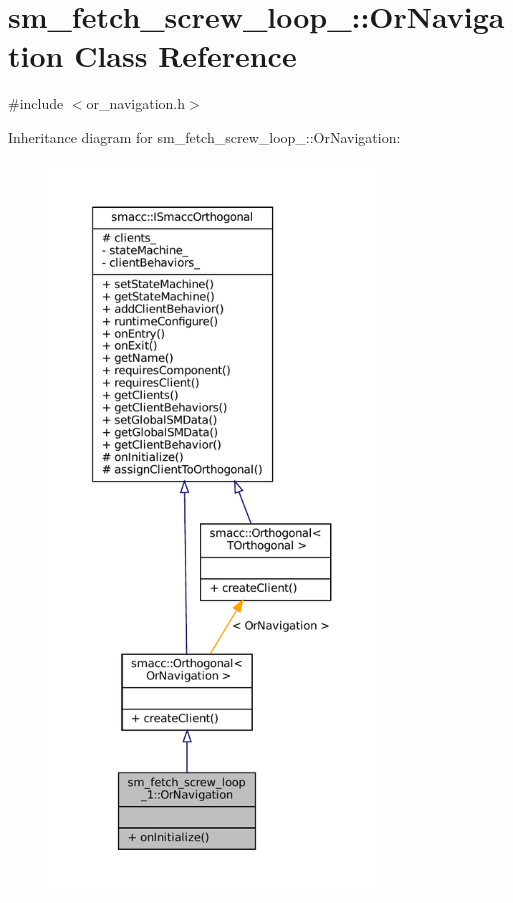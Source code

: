 \hypertarget{classsm__fetch__screw__loop__1_1_1OrNavigation}{}\section{sm\+\_\+fetch\+\_\+screw\+\_\+loop\+\_\+:\+:Or\+Navigation Class Reference}
\label{classsm__fetch__screw__loop__1_1_1OrNavigation}


{\ttfamily \#include $<$or\+\_\+navigation.\+h$>$}



Inheritance diagram for sm\+\_\+fetch\+\_\+screw\+\_\+loop\+\_\+:\+:Or\+Navigation\+:
\nopagebreak
\begin{figure}[H]
\begin{center}
\leavevmode
\includegraphics[height=550pt]{classsm__fetch__screw__loop__1_1_1OrNavigation__inherit__graph}
\end{center}
\end{figure}


